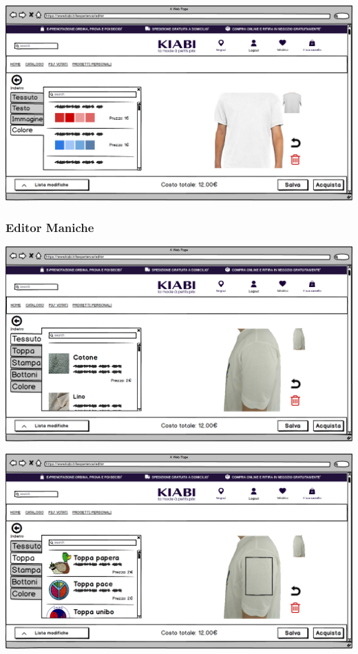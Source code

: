 \documentclass[12pt,italian,]{report}
\begin{document}
\includegraphics{balsamiq/Editor - caratteristica busto colore.png}
\subsubsection{Editor Maniche} 
\includegraphics{balsamiq/Editor - caratteristica maniche tessuto.png}


\includegraphics{balsamiq/Editor - caratteristica maniche toppa.png}
\end{document}
